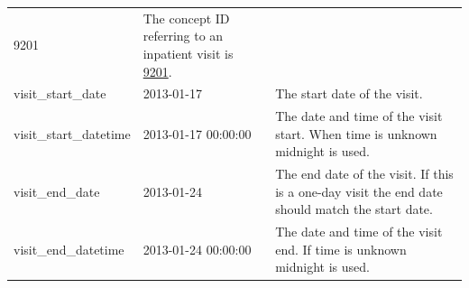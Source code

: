 \documentclass[11pt]{book}
\theoremstyle{definition}
\theoremstyle{definition}
\theoremstyle{definition}
\theoremstyle{remark}
\begin{document}
\begin{longtable}[]{@{}lll@{}}
\begin{minipage}[t]{0.15\columnwidth}
9201\strut
\end{minipage} & \begin{minipage}[t]{0.49\columnwidth}\raggedright
The concept ID referring to an inpatient visit is \href{http://athena.ohdsi.org/search-terms/terms/9201}{9201}.\strut
\end{minipage}\tabularnewline
\begin{minipage}[t]{0.28\columnwidth}\raggedright
visit\_start\_date\strut
\end{minipage} & \begin{minipage}[t]{0.15\columnwidth}\raggedright
2013-01-17\strut
\end{minipage} & \begin{minipage}[t]{0.49\columnwidth}\raggedright
The start date of the visit.\strut
\end{minipage}\tabularnewline
\begin{minipage}[t]{0.28\columnwidth}\raggedright
visit\_start\_datetime\strut
\end{minipage} & \begin{minipage}[t]{0.15\columnwidth}\raggedright
2013-01-17 00:00:00\strut
\end{minipage} & \begin{minipage}[t]{0.49\columnwidth}\raggedright
The date and time of the visit start. When time is unknown midnight is used.\strut
\end{minipage}\tabularnewline
\begin{minipage}[t]{0.28\columnwidth}\raggedright
visit\_end\_date\strut
\end{minipage} & \begin{minipage}[t]{0.15\columnwidth}\raggedright
2013-01-24\strut
\end{minipage} & \begin{minipage}[t]{0.49\columnwidth}\raggedright
The end date of the visit. If this is a one-day visit the end date should match the start date.\strut
\end{minipage}\tabularnewline
\begin{minipage}[t]{0.28\columnwidth}\raggedright
visit\_end\_datetime\strut
\end{minipage} & \begin{minipage}[t]{0.15\columnwidth}\raggedright
2013-01-24 00:00:00\strut
\end{minipage} & \begin{minipage}[t]{0.49\columnwidth}\raggedright
The date and time of the visit end. If time is unknown midnight is used.\strut
\end{minipage}\tabularnewline

\end{longtable}
\end{document}
